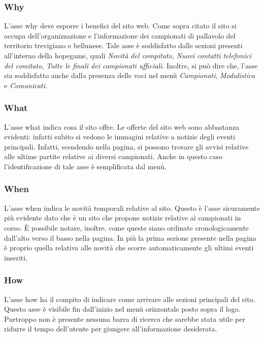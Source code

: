 	\subsubsection{Why}
	L'asse why deve esporre i benefici del sito web. Come sopra citato il sito si
	occupa dell'organizzazione e l'informazione dei campionati di pallavolo 
	del territorio trevigiano e bellunese. Tale asse è soddisfatto dalle sezioni 
	presenti all'interno della hopegame, quali \textit{Novità del compitato}, 
	\textit{Nuovi contatti telefonici del comitato}, \textit{Tutte le finali dei 
	campionati ufficiali}. Inoltre, si può dire che, l'asse sia soddisfatto anche
	dalla presenza delle voci nel menù \textit{Campionati}, \textit{Modulistica} e 
	\textit{Comunicati}. 
	
	\subsubsection{What}
	L'asse what indica cosa il sito offre. Le offerte del sito web sono abbastanza
	evidenti: infatti subito si vedono le immagini relative a notizie degli 
	eventi principali. Infatti, scendendo nella pagina, si possono trovare
	gli avvisi relative alle ultime partite relative ai diversi campionati.
	Anche in questo caso l'identificazione di tale asse è semplificata dal
	menù.
	
	\subsubsection{When}
	L'asse when indica le novità temporali relative al sito. Questo è l'asse
	sicuramente più evidente dato che è un sito che propone notizie relative ai 
	campionati in corso. È possibile notare, inoltre, come queste siano ordinate
	cronologicamente dall'alto verso il basso nella pagina. In più la prima sezione
	presente nella pagina è proprio quella relativa alle novità che scorre 
	automaticamente gli ultimi eventi inseriti.
	
	\subsubsection{How}
	L'asse how ha il compito di indicare come arrivare alle sezioni principali del
	sito. Questo asse è visibile fin dall'inizio nel menù orizzontale posto sopra
	il logo. Purtroppo non è presente nessuna barra di ricerca che sarebbe stata 
	utile per ridurre il tempo dell'utente per giungere all'informazione desiderata.
	
